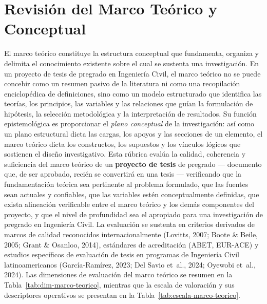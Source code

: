 \clearpage
\section{Revisión del Marco Teórico y Conceptual}

{\footnotesize
El marco teórico constituye la estructura conceptual que fundamenta, organiza y delimita el conocimiento existente sobre el cual se sustenta una investigación. En un proyecto de tesis de pregrado en Ingeniería Civil, el marco teórico no se puede concebir como un resumen pasivo de la literatura ni como una recopilación enciclopédica de definiciones, sino como un modelo estructurado que identifica las teorías, los principios, las variables y las relaciones que guían la formulación de hipótesis, la selección metodológica y la interpretación de resultados. Su función epistemológica es proporcionar el \textit{plano conceptual} de la investigación: así como un plano estructural dicta las cargas, los apoyos y las secciones de un elemento, el marco teórico dicta los constructos, los supuestos y los vínculos lógicos que sostienen el diseño investigativo. Esta rúbrica evalúa la calidad, coherencia y suficiencia del marco teórico de un \textbf{proyecto de tesis} de pregrado --- documento que, de ser aprobado, recién se convertirá en una tesis --- verificando que la fundamentación teórica sea pertinente al problema formulado, que las fuentes sean actuales y confiables, que las variables estén conceptualmente definidas, que exista alineación verificable entre el marco teórico y los demás componentes del proyecto, y que el nivel de profundidad sea el apropiado para una investigación de pregrado en Ingeniería Civil. La evaluación se sustenta en criterios derivados de marcos de calidad reconocidos internacionalmente (Lovitts, 2007; Boote \& Beile, 2005; Grant \& Osanloo, 2014), estándares de acreditación (ABET, EUR-ACE) y estudios específicos de evaluación de tesis en programas de Ingeniería Civil latinoamericanos (García-Ramírez, 2023; Del Savio et~al., 2024; Oyewobi et~al., 2024). Las dimensiones de evaluación del marco teórico se resumen en la Tabla~\ref{tab:dim-marco-teorico}, mientras que la escala de valoración y sus descriptores operativos se presentan en la Tabla~\ref{tab:escala-marco-teorico}.\par
}
\vspace{-8pt}
